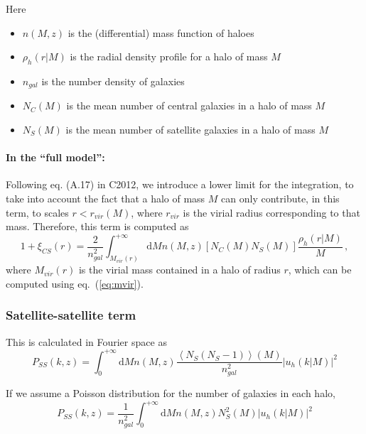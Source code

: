 \documentclass[10pt,a4paper]{article}
\begin{document}
Here
\begin{itemize}
\item $n(M,z)$ is the (differential) mass function of haloes
\item $\rho_h(r|M)$ is the radial density profile for a halo of mass $M$
\item $n_{gal}$ is the number density of galaxies
\item $N_C(M)$ is the mean number of central galaxies in a halo of mass $M$
\item $N_S(M)$ is the mean number of satellite galaxies in a halo of mass $M$
\end{itemize}

\paragraph{In the ``full model'':}

Following eq. (A.17) in C2012, we introduce a lower limit for the integration, to take into account the fact that a halo of mass $M$ can only contribute, in this term, to scales $r < r_{vir}(M)$, where $r_{vir}$ is the virial radius corresponding to that mass.
Therefore, this term is computed as
\begin{equation}
1 + \xi_{CS}(r) = \frac{2}{n_{gal}^2} \int_{M_{vir}(r)}^{+\infty} \mathrm{d}M n(M,z) \left[N_C(M) N_S(M)\right] \frac{\rho_h(r|M)}{M} \, ,
\end{equation}
where $M_{vir}(r)$ is the virial mass contained in a halo of radius $r$, which can be computed using eq.~(\ref{eq:mvir}).






\subsubsection{Satellite-satellite term}

This is calculated in Fourier space as
\begin{equation}
P_{SS}(k,z) = \int_0^{+\infty} \mathrm{d}M n(M,z) \frac{\left\langle N_S (N_S - 1) \right\rangle(M)}{n_{gal}^2} \left| u_h(k|M)\right|^2
\end{equation}

If we assume a Poisson distribution for the number of galaxies in each halo,
\begin{equation}
P_{SS}(k,z) = \frac{1}{n_{gal}^2}\int_0^{+\infty} \mathrm{d}M n(M,z) N_S^2(M) \left| u_h(k|M)\right|^2
\end{equation}
\end{document}
